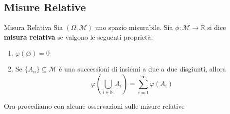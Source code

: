 \newpage
\subsection{Misure Relative}
\begin{definition}{Misura Relativa}
Sia \((\Omega, \mathcal{M})\) uno spazio misurabile. Sia \(\phi: \mathcal{M} \to
\mathbb{R}\) si dice \textbf{misura relativa} se valgono le seguenti proprietà:
\begin{enumerate}[label = \arabic*.]
    \item \(\varphi(\varnothing) = 0\)  
    \item Se \(\{A_{n}\} \subseteq\mathcal{M} \) è una successioni di insiemi a
        due a due disgiunti, allora
        \[
            \varphi\left( \bigcup_{i \in \mathbb{N}} A_{i} \right) =
            \sum_{i=1}^{\infty} \varphi(A_{i}) 
        \]
\end{enumerate}
\end{definition}

Ora procediamo con alcune osservazioni sulle misure relative

